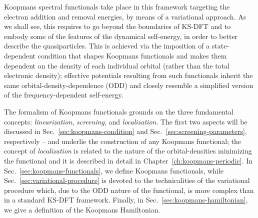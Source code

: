 Koopmans spectral functionals take place in this framework targeting the electron addition and removal energies, by means of a variational approach. As we shall see, this requires to go beyond the boundaries of KS-DFT and to embody some of the features of the dynamical self-energy, in order to better describe the quasiparticles. This is achieved via the imposition of a state-dependent condition that shapes Koopmans functionals and makes them dependent on the density of each individual orbital (rather than the total electronic density); effective potentials resulting from such functionals inherit the same orbital-density-dependence (ODD) and closely resemble a simplified version of the frequency-dependent self-energy.

The formalism of Koopmans functionals grounds on the three fundamental concepts: \emph{linearization}, \emph{screening}, and \emph{localization}. The first two aspects will be discussed in Sec.~\ref{sec:koopmans-condition} and Sec.~\ref{sec:screening-parameters}, respectively -- and underlie the construction of any Koopmans functional; the concept of \emph{localization} is related to the nature of the orbital-densities minimizing the functional and it is described in detail in Chapter~\ref{ch:koopmans-periodic}. In Sec.~\ref{sec:koopmans-functionals}, we define Koopmans functionals, while Sec.~\ref{sec:variational-procedure} is devoted to the technicalities of the variational procedure which, due to the ODD nature of the functional, is more complex than in a standard KS-DFT framework. Finally, in Sec.~\ref{sec:koopmans-hamiltonian}, we give a definition of the Koopmans Hamiltonian.

